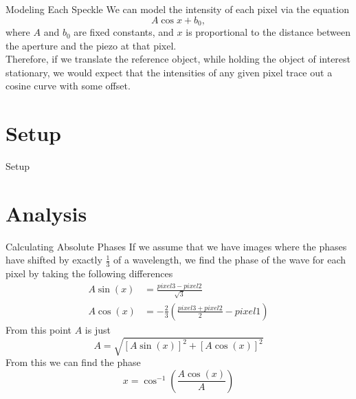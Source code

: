 \documentclass[pdf]{beamer}
\begin{document}
\begin{frame}{Modeling Each Speckle}
We can model the intensity of each pixel via the equation$$A\cos x + b_0,$$where $A$ and $b_0$ are fixed constants, and $x$ is proportional to the distance between the aperture and the piezo at that pixel.\\
\vspace{0.5cm}
Therefore, if we translate the reference object, while holding the object of interest stationary, we would expect that the intensities of any given pixel trace out a cosine curve with some offset.
\end{frame}

\section{Setup}
\begin{frame}{Setup}

\end{frame}

\section{Analysis}
\begin{frame}{Calculating Absolute Phases}
If we assume that we have images where the phases have shifted by exactly $\frac13$ of a wavelength, we find the phase of the wave for each pixel by taking the following differences
\begin{align*}
	A\sin(x) &= \frac{pixel3 - pixel2}{\sqrt 3}\\
	A\cos(x) &= -\frac23 \left(\frac{pixel3 + pixel2}{2} - pixel1\right)
\end{align*}
From this point $A$ is just
$$A = \sqrt{[A\sin(x)]^2 + [A\cos(x)]^2}$$
From this we can find the phase
$$x = \cos^{-1}\left(\frac{A\cos(x)}{A}\right)$$
\end{frame}
\end{document}
